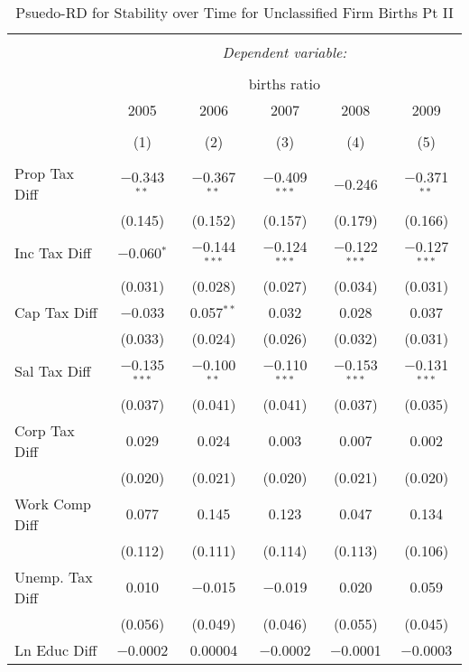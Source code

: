 
\begin{table}[!htbp] \centering 
  \caption{Psuedo-RD for Stability over Time for  Unclassified Firm Births Pt II} 
  \label{99year} 
\small 
\begin{tabular}{@{\extracolsep{5pt}}lccccc} 
\\[-1.8ex]\hline 
\hline \\[-1.8ex] 
 & \multicolumn{5}{c}{\textit{Dependent variable:}} \\ 
\cline{2-6} 
\\[-1.8ex] & \multicolumn{5}{c}{births ratio} \\ 
 & 2005 & 2006 & 2007 & 2008 & 2009 \\ 
\\[-1.8ex] & (1) & (2) & (3) & (4) & (5)\\ 
\hline \\[-1.8ex] 
 Prop Tax Diff & $-$0.343$^{**}$ & $-$0.367$^{**}$ & $-$0.409$^{***}$ & $-$0.246 & $-$0.371$^{**}$ \\ 
  & (0.145) & (0.152) & (0.157) & (0.179) & (0.166) \\ 
  Inc Tax Diff & $-$0.060$^{*}$ & $-$0.144$^{***}$ & $-$0.124$^{***}$ & $-$0.122$^{***}$ & $-$0.127$^{***}$ \\ 
  & (0.031) & (0.028) & (0.027) & (0.034) & (0.031) \\ 
  Cap Tax Diff & $-$0.033 & 0.057$^{**}$ & 0.032 & 0.028 & 0.037 \\ 
  & (0.033) & (0.024) & (0.026) & (0.032) & (0.031) \\ 
  Sal Tax Diff & $-$0.135$^{***}$ & $-$0.100$^{**}$ & $-$0.110$^{***}$ & $-$0.153$^{***}$ & $-$0.131$^{***}$ \\ 
  & (0.037) & (0.041) & (0.041) & (0.037) & (0.035) \\ 
  Corp Tax Diff & 0.029 & 0.024 & 0.003 & 0.007 & 0.002 \\ 
  & (0.020) & (0.021) & (0.020) & (0.021) & (0.020) \\ 
  Work Comp Diff & 0.077 & 0.145 & 0.123 & 0.047 & 0.134 \\ 
  & (0.112) & (0.111) & (0.114) & (0.113) & (0.106) \\ 
  Unemp. Tax Diff & 0.010 & $-$0.015 & $-$0.019 & 0.020 & 0.059 \\ 
  & (0.056) & (0.049) & (0.046) & (0.055) & (0.045) \\ 
  Ln Educ Diff & $-$0.0002 & 0.00004 & $-$0.0002 & $-$0.0001 & $-$0.0003 \\ 

\end{tabular}
\end{table}
